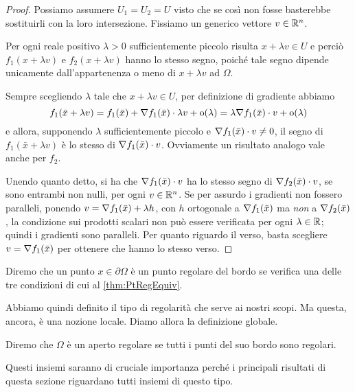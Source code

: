 \begin{proof}
	Possiamo assumere $U_1=U_2=U$ visto che se così non fosse basterebbe sostituirli con la loro intersezione. Fissiamo un generico vettore $v\in\mathbb R^n$.
	
	Per ogni reale positivo $\lambda>0$ sufficientemente piccolo risulta $x+\lambda v\in U$ e perciò $f_1(x+\lambda v)$ e $f_2(x+\lambda v)$ hanno lo stesso segno, poiché tale segno dipende unicamente dall'appartenenza o meno di $x+\lambda v$ ad $\Omega$. 
	
	Sempre scegliendo $\lambda$ tale che $x+\lambda v\in U$, per definizione di gradiente abbiamo
	\begin{equation*}
		f_1(\bar x+\lambda v)=f_1(\bar x)+\nabla f_1(\bar x)\cdot \lambda v+\mathrm{o}(\lambda)=\lambda \nabla f_1(\bar x)\cdot v+\mathrm{o}(\lambda)
	\end{equation*}
	e allora, supponendo $\lambda$ sufficientemente piccolo e $\nabla f_1(\bar x)\cdot v\not =0$, il segno di $f_1(\bar x+\lambda v)$ è lo stesso di $\nabla f_1(\bar x)\cdot v$.
	Ovviamente un risultato analogo vale anche per $f_2$.
	
	Unendo quanto detto, si ha che $\nabla f_1(\bar x)\cdot v$ ha lo stesso segno di $\nabla f_2(\bar x)\cdot v$, se sono entrambi non nulli, per ogni $v\in\mathbb R^n$. 
	Se per assurdo i gradienti non fossero paralleli, ponendo $v=\nabla f_1(\bar x)+\lambda h$, con $h$ ortogonale a $\nabla f_1(\bar x)$ ma \emph{non} a $\nabla f_2(\bar x)$, la condizione sui prodotti scalari non può essere verificata per ogni $\lambda\in\mathbb R$; quindi i gradienti sono paralleli. Per quanto riguardo il verso, basta scegliere $v=\nabla f_1(\bar x)$ per ottenere che hanno lo stesso verso.
\end{proof}


\begin{definition}
	Diremo che un punto $x\in \partial \Omega$ è un punto regolare del bordo se verifica una delle tre condizioni di cui
	al \cref{thm:PtRegEquiv}.
\end{definition}

Abbiamo quindi definito il tipo di regolarità che serve ai nostri scopi. Ma questa, ancora, è una nozione locale. Diamo allora la definizione globale.

\begin{definition}
	Diremo che $\Omega$ è un aperto regolare se tutti i punti del suo bordo sono regolari.
\end{definition}

Questi insiemi saranno di cruciale importanza perché i principali risultati di questa sezione riguardano tutti insiemi di questo tipo.

